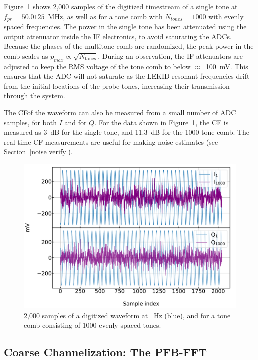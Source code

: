 Figure~\ref{fig:adc} shows 2,000 samples of the digitized timestream of a single tone at $f_{pr} = 50.0125$~MHz, as well as for a tone comb with $N_{tones} = 1000$ with evenly spaced frequencies. The power in the single tone has been attenuated using the output attenuator inside the IF electronics, to avoid saturating the ADCs. Because the phases of the multitone comb are randomized, the peak power in the comb scales as $p_{max} \propto \sqrt{N_{\mathrm{tones}}}$. During an observation, the IF attenuators are adjusted to keep the RMS voltage of the tone comb to below $\approx$~100~mV. This ensures that the ADC will not saturate as the LEKID resonant frequencies drift from the initial locations of the probe tones, increasing their transmission through the system.

The CFof the waveform can also be measured from a small number of ADC samples, for both $I$ and for $Q$. For the data shown in Figure~\ref{fig:adc}, the CF is measured as 3~dB for the single tone, and 11.3~dB for the 1000 tone comb. The real-time CF measurements are useful for making noise estimates (see Section~\ref{noise verify}).

\begin{figure}[!htbp]
\centering
\includegraphics[width=\textwidth]{figures/readout/sim/adc}
\caption[~2,000  samples of a digitized waveform for a single tone at f = 50.0125~Hz, and 1000 evenly spaced tones.]{2,000  samples of a digitized waveform at ~Hz (blue), and for a tone comb consisting of 1000 evenly spaced tones.}
\label{fig:adc}
\end{figure}

\subsection{Coarse Channelization: The PFB-FFT}\label{pfb}

